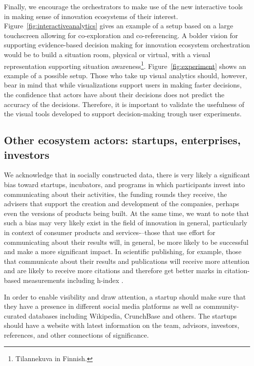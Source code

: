 Finally, we encourage the orchestrators to make use of the new interactive tools in making sense of innovation ecosystems of their interest. Figure~\ref{fig:interactiveanalytics} gives an example of a setup based on a large touchscreen allowing for co-exploration and co-referencing. A bolder vision for supporting evidence-based decision making for innovation ecosystem orchestration would be to build a situation room, physical or virtual, with a visual representation supporting situation awareness\footnote{Tilannekuva in Finnish.}. Figure~\ref{fig:experiment} shows an example of a possible setup. Those who take up visual analytics should, however, bear in mind that while visualizations support users in making faster decisions, the confidence that actors have about their decisions does not predict the accuracy of the decisions. Therefore, it is important to validate the usefulness of the visual tools developed to support decision-making trough user experiments.

\subsection{Other ecosystem actors: startups, enterprises, investors}

We acknowledge that in socially constructed data, there is very likely a significant bias toward startups, incubators, and programs in which participants invest into communicating about their activities, the funding rounds they receive, the advisers that support the creation and development of the companies, perhaps even the versions of products being built. At the same time, we want to note that such a bias may very likely exist in the field of innovation in general, particularly in context of consumer products and services-–those that use effort for communicating about their results will, in general, be more likely to be successful and make a more significant impact. In scientific publishing, for example, those that communicate about their results and publications will receive more attention and are likely to receive more citations and therefore get better marks in citation-based measurements including h-index \citep[cf.][]{Terras2012}. 

In order to enable visibility and draw attention, a startup should make sure that they have a presence in different social media platforms as well as community-curated databases including Wikipedia, CrunchBase and others. The startups should have a website with latest information on the team, advisors, investors, references, and other connections of significance. 

